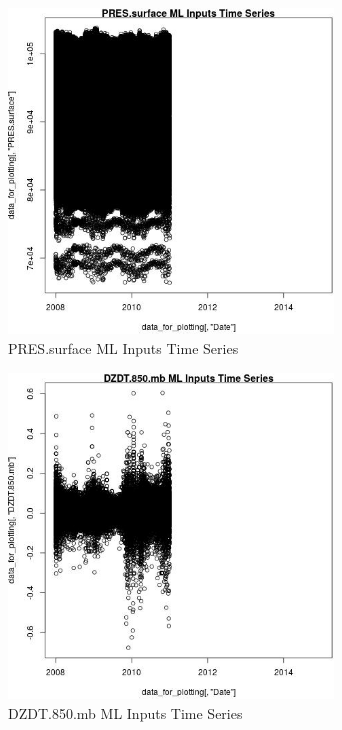 \begin{figure} 
\centering  
\includegraphics[width=0.77\textwidth]{Code_Outputs/ML_input_report_ML_input_PM25_Step5_part_d_de_duplicated_aves_ML_input_PRESsurfacevDate.jpg} 
\caption{\label{fig:ML_input_report_ML_input_PM25_Step5_part_d_de_duplicated_aves_ML_inputPRESsurfacevDate}PRES.surface ML Inputs Time Series} 
\end{figure} 
 

\begin{figure} 
\centering  
\includegraphics[width=0.77\textwidth]{Code_Outputs/ML_input_report_ML_input_PM25_Step5_part_d_de_duplicated_aves_ML_input_DZDT850mbvDate.jpg} 
\caption{\label{fig:ML_input_report_ML_input_PM25_Step5_part_d_de_duplicated_aves_ML_inputDZDT850mbvDate}DZDT.850.mb ML Inputs Time Series} 
\end{figure} 
 

